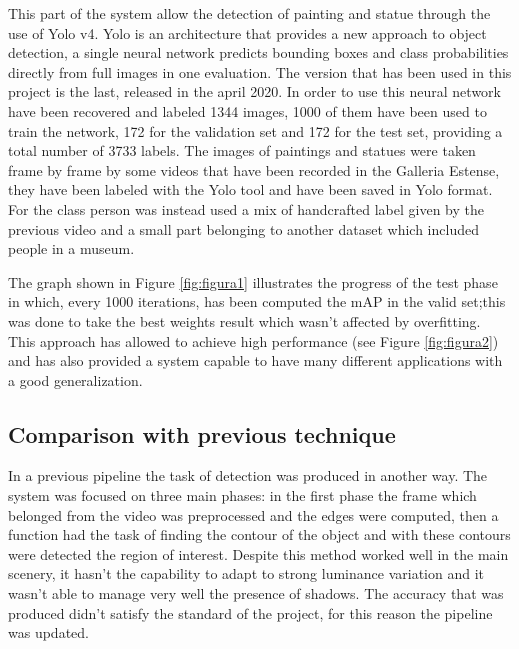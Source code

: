 This part of the system allow the detection of painting and statue through the use of Yolo v4.
Yolo is an architecture that provides a new approach to object detection, a single neural network predicts bounding boxes and class probabilities directly from full images in one evaluation. The version that has been used in this project is the last, released in the april 2020.
In order to use this neural network have been recovered and labeled 1344 images, 1000 of them have been used to train the network, 172 for the validation set and 172 for the test set, providing a total number of 3733 labels. The images of paintings and statues were taken frame by frame by some videos that have been recorded in the Galleria Estense, they have been labeled with the Yolo tool and have been saved in Yolo format. For the class person was instead used a mix of handcrafted label given by the previous video and a small part belonging to another dataset which included people in a museum.

The graph shown in Figure \ref{fig:figura1} illustrates the progress of the test phase in which, every 1000 iterations, has been computed the mAP in the valid set;this was done to take the best weights result which wasn't affected by overfitting.
This approach has allowed to achieve high performance (see Figure \ref{fig:figura2}) %
and has also provided a system capable to have many different applications with a good generalization.


\subsection{Comparison with previous technique} 
In a previous pipeline the task of detection was produced in another way.
The system was focused on three main phases: in the first phase the frame which belonged from the video was preprocessed and the edges were computed, then a function had the task of finding the contour of the object and with these contours were detected the region of interest. Despite this method worked well in the main scenery, it hasn't the capability to adapt to strong luminance variation and it wasn't able to manage very well the presence of shadows.
The accuracy that was produced didn't satisfy the standard of the project, for this reason the pipeline was updated.


